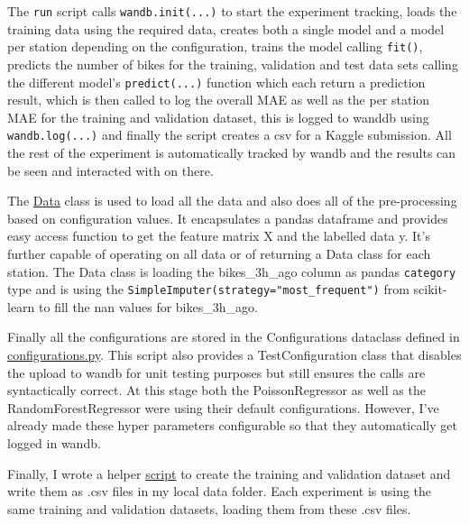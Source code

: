 \documentclass[a4paper]{article}
\begin{document}
    The \texttt{run} script calls \texttt{wandb.init(...)} to start the experiment tracking, loads the training data using the required data,
    creates both a single model and a model per station depending on the configuration, trains the model calling \texttt{fit()},
    predicts the number of bikes for the training, validation and test data sets calling the different model's \texttt{predict(...)}
    function which each return a prediction result, which is then called to log the overall MAE as well as the per
    station MAE for the training and validation dataset, this is logged to wanddb using \texttt{wandb.log(...)} and finally
    the script creates a csv for a Kaggle submission. All the rest of the experiment is automatically tracked by wandb
    and the results can be seen and interacted with on there.

    The \href{https://github.com/isabelladegen/mlp-2021/blob/c48d85dc364b5a2e7e59f16961b32f9e6c245735/src/Data.py}{Data} class
    is used to load all the data and also does all of the pre-processing based on configuration values. It encapsulates
    a pandas dataframe and provides easy access function to get the feature matrix X and the labelled data y. It's further
    capable of operating on all data or of returning a Data class for each station. The Data class is loading the
    bikes\_3h\_ago column as pandas \texttt{category} type and is using the
    \texttt{SimpleImputer(strategy="most\_frequent")} from scikit-learn to fill the nan values for bikes\_3h\_ago.

    Finally all the configurations are stored in the Configurations dataclass defined in
    \href{https://github.com/isabelladegen/mlp-2021/blob/c48d85dc364b5a2e7e59f16961b32f9e6c245735/src/configurations.py}{configurations.py}.
    This script also provides a TestConfiguration class that disables the upload to wandb for unit testing purposes but
    still ensures the calls are syntactically correct. At this stage both the PoissonRegressor as well as the RandomForestRegressor
    were using their default configurations. However,
    I've already made these hyper parameters configurable so that they automatically get logged in wandb.

    Finally, I wrote a helper \href{https://github.com/isabelladegen/mlp-2021/blob/c48d85dc364b5a2e7e59f16961b32f9e6c245735/src/create_dev_and_validation_csv.py}{script}
    to create the training and validation dataset and write them as .csv files in my local
    data folder. Each experiment is using the same training and validation datasets, loading them from these .csv files.
\end{document}
